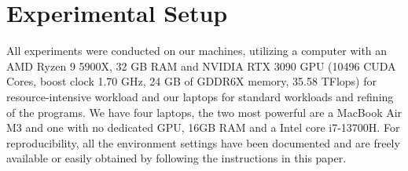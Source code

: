 \section{Experimental Setup}
\label{sec:setup}
All experiments were conducted on our machines, utilizing a computer with an AMD Ryzen 9 5900X, 32 GB RAM and NVIDIA RTX 3090 GPU (10496 CUDA Cores, boost clock 1.70 GHz, 24 GB of GDDR6X memory, 35.58 TFlops) for resource-intensive workload and our laptops for standard workloads and refining of the programs. We have four laptops, the two most powerful are a MacBook Air M3 and one with no dedicated GPU, 16GB RAM and a Intel core i7-13700H. 
For reproducibility, all the environment settings have been documented and are freely available or easily obtained by following the instructions in this paper.

